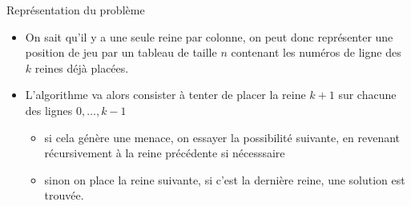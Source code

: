 \documentclass[10pt]{beamer}
\begin{document}
\begin{frame}[fragile]{\Ctitle}{\stitle}
	\begin{exampleblock}{Représentation du problème}
        \begin{itemize}
		\item <1-> On sait qu'il y a une seule reine par colonne, on peut donc représenter une position de jeu par un tableau de taille $n$ contenant les numéros de ligne des $k$ reines déjà placées.
		\item <2-> L'algorithme va alors consister à tenter de placer la reine $k+1$ sur chacune des lignes $0, \dots, k-1$
		\begin{itemize}
            \item si cela génère une menace, on essayer la possibilité suivante, en revenant récursivement à la reine précédente si nécesssaire
            \item sinon on place la reine suivante, si c'est la dernière reine, une solution est trouvée.
        \end{itemize}
    \end{itemize}
	\end{exampleblock}
\end{frame}
\end{document}
